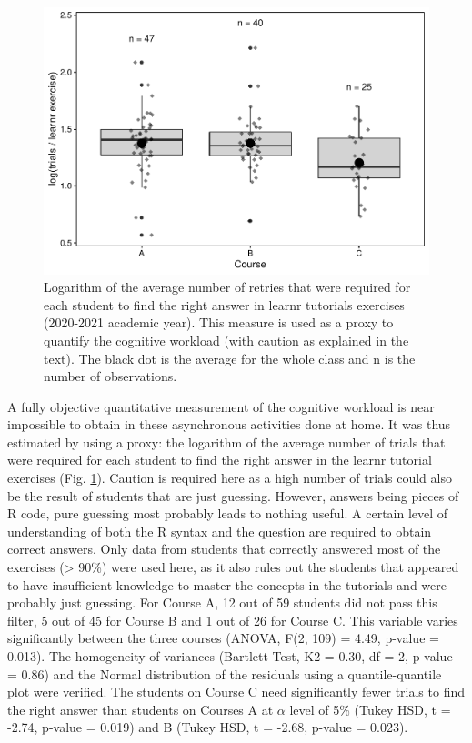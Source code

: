 \documentclass{aims}
\theoremstyle{definition}
\begin{document}
\begin{figure}
\includegraphics[width=1\linewidth]{teaching_data_science_files/figure-latex/fig_learn_trials-1} \caption{\label{fig:fig_learn_trials} Logarithm of the average number of retries that were required for each student to find the right answer in learnr tutorials exercises (2020-2021 academic year). This measure is used as a proxy to quantify the cognitive workload (with caution as explained in the text). The black dot is the average for the whole class and n is the number of observations.}\label{fig:fig_learn_trials}
\end{figure}

A fully objective quantitative measurement of the cognitive workload is
near impossible to obtain in these asynchronous activities done at home.
It was thus estimated by using a proxy: the logarithm of the average
number of trials that were required for each student to find the right
answer in the learnr tutorial exercises (Fig.
\ref {fig:fig_learn_trials}). Caution is required here as a high number
of trials could also be the result of students that are just guessing.
However, answers being pieces of R code, pure guessing most probably
leads to nothing useful. A certain level of understanding of both the R
syntax and the question are required to obtain correct answers. Only
data from students that correctly answered most of the exercises
(\textgreater{} 90\%) were used here, as it also rules out the students
that appeared to have insufficient knowledge to master the concepts in
the tutorials and were probably just guessing. For Course A, 12 out of
59 students did not pass this filter, 5 out of 45 for Course B and 1 out
of 26 for Course C. This variable varies significantly between the three
courses (ANOVA, F(2, 109) = 4.49, p-value = 0.013). The homogeneity of
variances (Bartlett Test, K2 = 0.30, df = 2, p-value = 0.86) and the
Normal distribution of the residuals using a quantile-quantile plot were
verified. The students on Course C need significantly fewer trials to
find the right answer than students on Courses A at \(\alpha\) level of
5\% (Tukey HSD, t = -2.74, p-value = 0.019) and B (Tukey HSD, t = -2.68,
p-value = 0.023).
\end{document}
